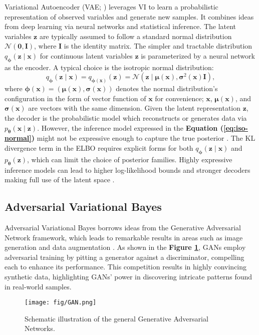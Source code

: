 \documentclass[a4paper,12pt]{article}
\theoremstyle{plain} %
\theoremstyle{remark} %
\theoremstyle{definition} %
\begin{document}
Variational Autoencoder (VAE; \citealp{kingma2013auto,urban2021deep}) leverages VI to learn a probabilistic representation of observed variables and generate new samples. It combines ideas from deep learning via neural networks and statistical inference. The latent variables $\bm{z}$ are typically assumed to follow a standard normal distribution $\mathcal{N}(\bm{0},\bm{I})$, where $\bm{I}$ is the identity matrix. The simpler and tractable distribution $q_{\bm{\phi}}(\bm{z}\mid\bm{x})$ for continuous latent variables $\bm{z}$ is parameterized by a neural network as the encoder. A typical choice is the isotropic normal distribution:
\begin{equation}\label{eq:iso-normal}
    q_{\bm{\phi}}(\bm{z}\mid\bm{x})=q_{\bm{\phi}(\bm{x})}(\bm{z})=\mathcal{N}(\bm{z} \mid \bm{\mu}(\bm{x}),\bm{\sigma}^2(\bm{x})\bm{I}),
\end{equation}
where $\bm{\phi}(\bm{x})=(\bm{\mu}(\bm{x}),\bm{\sigma}(\bm{x}))$ denotes the normal distribution's configuration in the form of vector function of $\bm{x}$ for convenience; $\bm{x}$, $\bm{\mu}(\bm{x})$, and $\bm{\sigma}(\bm{x})$ are vectors with the same dimension. Given the latent representation $\bm{z}$, the decoder is the probabilistic model which reconstructs or generates data via $p_{\bm{\theta}}(\bm{x} \mid \bm{z})$. However, the inference model expressed in the \textbf{Equation (\ref{eq:iso-normal})} might not be expressive enough to capture the true posterior \citep{mescheder2017adversarial}. The KL divergence term in the ELBO requires explicit forms for both $q_{\bm{\phi}}(\bm{z}\mid\bm{x})$ and $p_{\bm{\theta}}(\bm{z})$, which can limit the choice of posterior families. Highly expressive inference models can lead to higher log-likelihood bounds and stronger decoders making full use of the latent space \citep{kingma2016improved,chen2016variational}.

\subsection{Adversarial Variational Bayes}\label{sec:avb}
Adversarial Variational Bayes borrows ideas from the Generative Adversarial Network framework, which leads to remarkable results in areas such as image generation \citep{goodfellow2014generative} and data augmentation \citep{zhu2017data}. As shown in the \textbf{Figure \ref{fig:gan}}, GANs employ adversarial training by pitting a generator against a discriminator, compelling each to enhance its performance. This competition results in highly convincing synthetic data, highlighting GANs’ power in discovering intricate patterns found in real-world samples. 
\begin{figure}[htb]
\centering
\texttt{[image: fig/GAN.png]}
\caption{Schematic illustration of the general Generative Adversarial Networks.}
\label{fig:gan}
\end{figure}
\end{document}
